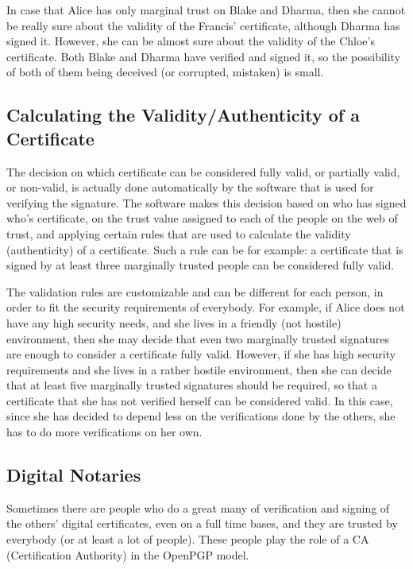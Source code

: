 \documentclass[a4paper]{article}
\begin{document}
In case that Alice has only marginal trust on Blake and Dharma, then
she cannot be really sure about the validity of the Francis'
certificate, although Dharma has signed it. However, she can be almost
sure about the validity of the Chloe's certificate. Both Blake and
Dharma have verified and signed it, so the possibility of both of them
being deceived (or corrupted, mistaken) is small.

\subsection{Calculating the Validity/Authenticity of a Certificate}

The decision on which certificate can be considered fully valid, or
partially valid, or non-valid, is actually done automatically by the
software that is used for verifying the signature. The software makes
this decision based on who has signed who's certificate, on the trust
value assigned to each of the people on the web of trust, and
applying certain rules that are used to calculate the validity
(authenticity) of a certificate. Such a rule can be for example: a
certificate that is signed by at least three marginally trusted people
can be considered fully valid.

The validation rules are customizable and can be different for each
person, in order to fit the security requirements of everybody. For
example, if Alice does not have any high security needs, and she lives
in a friendly (not hostile) environment, then she may decide that even
two marginally trusted signatures are enough to consider a certificate
fully valid. However, if she has high security requirements and she
lives in a rather hostile environment, then she can decide that at
least five marginally trusted signatures should be required, so that a
certificate that she has not verified herself can be considered valid.
In this case, since she has decided to depend less on the
verifications done by the others, she has to do more verifications
on her own.

\subsection{Digital Notaries}

Sometimes there are people who do a great many of verification and
signing of the others' digital certificates, even on a full time
bases, and they are trusted by everybody (or at least a lot of
people). These people play the role of a CA (Certification Authority)
in the OpenPGP model.
\end{document}
